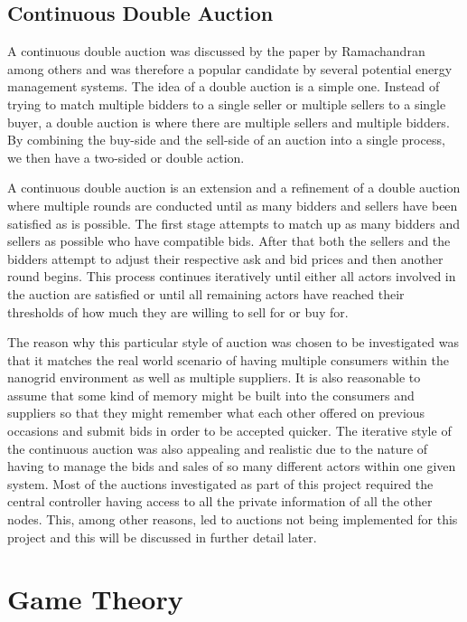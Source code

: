 \documentclass[a4paper, notitlepage]{report}
\begin{document}
\section{Continuous Double Auction}
\label{sec:org72340a8}
A continuous double auction was discussed by the paper by Ramachandran
\cite{ramachandran2011intelligent} among others and was therefore a popular
candidate by several potential energy management systems. The idea of a double
auction is a simple one. Instead of trying to match multiple bidders to a single
seller or multiple sellers to a single buyer, a double auction is where there
are multiple sellers and multiple bidders. By combining the buy-side and the
sell-side of an auction into a single process, we then have a two-sided or
double action.

A continuous double auction is an extension and a refinement of a double auction
where multiple rounds are conducted until as many bidders and sellers have been
satisfied as is possible. The first stage attempts to match up as many bidders
and sellers as possible who have compatible bids. After that both the sellers
and the bidders attempt to adjust their respective ask and bid prices and then
another round begins. This process continues iteratively until either all actors
involved in the auction are satisfied or until all remaining actors have reached
their thresholds of how much they are willing to sell for or buy for.

The reason why this particular style of auction was chosen to be investigated
was that it matches the real world scenario of having multiple consumers within
the nanogrid environment as well as multiple suppliers. It is also reasonable to
assume that some kind of memory might be built into the consumers and suppliers
so that they might remember what each other offered on previous occasions and
submit bids in order to be accepted quicker. The iterative style of the
continuous auction was also appealing and realistic due to the nature of having
to manage the bids and sales of so many different actors within one given
system. Most of the auctions investigated as part of this project required the
central controller having access to all the private information of all the other
nodes. This, among other reasons, led to auctions not being implemented for this
project and this will be discussed in further detail later.
\chapter{Game Theory}
\label{sec:org1c729c5}
\end{document}

